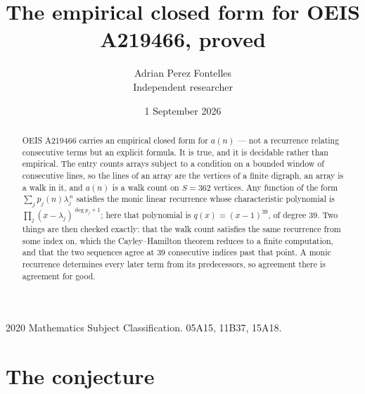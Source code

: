 \documentclass[11pt,a4paper]{article}
\title{The empirical closed form for OEIS A219466, proved}
\author{Adrian Perez Fontelles\\ \small Independent researcher}
\date{1 September 2026}
\theoremstyle{plain}
\theoremstyle{definition}
\begin{document}
\maketitle

\begin{abstract}
OEIS A219466 carries an empirical closed form for $a(n)$ --- not a recurrence relating
consecutive terms but an explicit formula. It is true, and it is decidable rather than
empirical. The entry counts arrays subject to a condition on a bounded window of consecutive lines, so the lines of an array are the
vertices of a finite digraph, an array is a walk in it, and $a(n)$ is a walk count on
$S=362$ vertices. Any function of the form $\sum_j p_j(n)\lambda_j^{\,n}$ satisfies the
monic linear recurrence whose characteristic polynomial is
$\prod_j(x-\lambda_j)^{\deg p_j+1}$; here that polynomial is $q(x)=(x-1)^{39}$, of degree
$39$. Two things are then checked exactly: that the walk count satisfies the same
recurrence from some index on, which the Cayley--Hamilton theorem reduces to a finite
computation, and that the two sequences agree at $39$ consecutive indices past that
point. A monic recurrence determines every later term from its predecessors, so agreement
there is agreement for good.
\end{abstract}

\noindent\small 2020 Mathematics Subject Classification. 05A15, 11B37, 15A18.\normalsize

\section{The conjecture}
\end{document}
